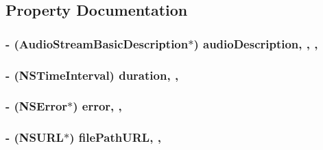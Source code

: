 \subsection{Property Documentation}
\hypertarget{interface_s_e_audio_stream_a96f11351b56bdd1d363ad05fb80d1a73}{
\subsubsection[{audio\-Description}]{\setlength{\rightskip}{0pt plus 5cm}-\/ (Audio\-Stream\-Basic\-Description$\ast$) audio\-Description\hspace{0.3cm}{\ttfamily [read]}, {\ttfamily [write]}, {\ttfamily [nonatomic]}, {\ttfamily [assign]}}}\label{interface_s_e_audio_stream_a96f11351b56bdd1d363ad05fb80d1a73}
\hypertarget{interface_s_e_audio_stream_af5e4493693cf24fa25af34487993d693}{
\subsubsection[{duration}]{\setlength{\rightskip}{0pt plus 5cm}-\/ (N\-S\-Time\-Interval) duration\hspace{0.3cm}{\ttfamily [read]}, {\ttfamily [nonatomic]}, {\ttfamily [assign]}}}\label{interface_s_e_audio_stream_af5e4493693cf24fa25af34487993d693}
\hypertarget{interface_s_e_audio_stream_a095232a32323fc1b43568e1609cc934d}{
\subsubsection[{error}]{\setlength{\rightskip}{0pt plus 5cm}-\/ (N\-S\-Error$\ast$) error\hspace{0.3cm}{\ttfamily [read]}, {\ttfamily [nonatomic]}, {\ttfamily [assign]}}}\label{interface_s_e_audio_stream_a095232a32323fc1b43568e1609cc934d}
\hypertarget{interface_s_e_audio_stream_a7561aaa75262c747a4da3d701e2094b9}{
\subsubsection[{file\-Path\-U\-R\-L}]{\setlength{\rightskip}{0pt plus 5cm}-\/ (N\-S\-U\-R\-L$\ast$) file\-Path\-U\-R\-L\hspace{0.3cm}{\ttfamily [read]}, {\ttfamily [nonatomic]}, {\ttfamily [assign]}}}\label{interface_s_e_audio_stream_a7561aaa75262c747a4da3d701e2094b9}
